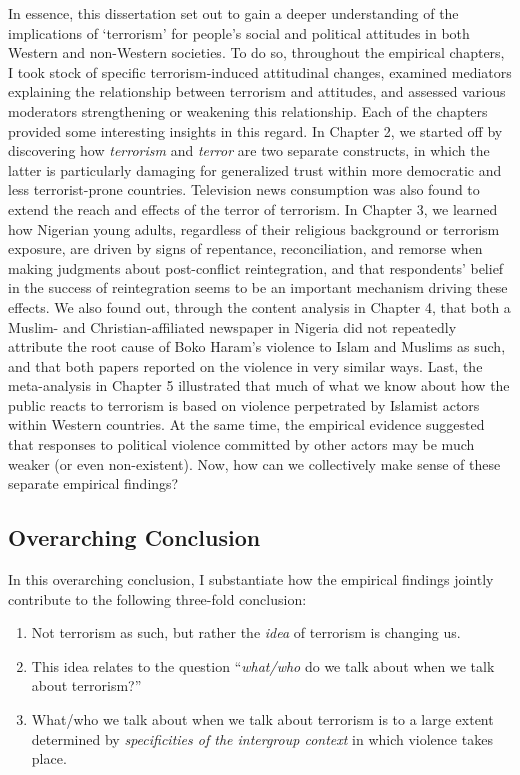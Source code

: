 In essence, this dissertation set out to gain a deeper understanding of the implications of `terrorism' for people's social and political attitudes in both Western and non-Western societies. To do so, throughout the empirical chapters, I took stock of specific terrorism-induced attitudinal changes, examined mediators explaining the relationship between terrorism and attitudes, and assessed various moderators strengthening or weakening this relationship. Each of the chapters provided some interesting insights in this regard. In Chapter 2, we started off by discovering how \textit{terrorism} and \textit{terror} are two separate constructs, in which the latter is particularly damaging for generalized trust within more democratic and less terrorist-prone countries. Television news consumption was also found to extend the reach and effects of the terror of terrorism. In Chapter 3, we learned how Nigerian young adults, regardless of their religious background or terrorism exposure, are driven by signs of repentance, reconciliation, and remorse when making judgments about post-conflict reintegration, and that respondents' belief in the success of reintegration seems to be an important mechanism driving these effects. We also found out, through the content analysis in Chapter 4, that both a Muslim- and Christian-affiliated newspaper in Nigeria did not repeatedly attribute the root cause of Boko Haram's violence to Islam and Muslims as such, and that both papers reported on the violence in very similar ways. Last, the meta-analysis in Chapter 5 illustrated that much of what we know about how the public reacts to terrorism is based on violence perpetrated by Islamist actors within Western countries. At the same time, the empirical evidence suggested that responses to political violence committed by other actors may be much weaker (or even non-existent). Now, how can we collectively make sense of these separate empirical findings?



\subsection{Overarching Conclusion}
\label{sec:611}
In this overarching conclusion, I substantiate how the empirical findings jointly contribute to the following three-fold conclusion: 

\begin{enumerate}[noitemsep]
    \item Not terrorism as such, but rather the \textit{idea} of terrorism is changing us. 
    \item This idea relates to the question ``\textit{what/who} do we talk about when we talk about terrorism?''
    \item What/who we talk about when we talk about terrorism is to a large extent determined by \textit{specificities of the intergroup context} in which violence takes place.
\end{enumerate}

